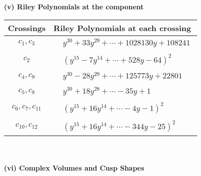 \documentclass[1p]{elsarticle_modified}
\theoremstyle{definition}
\begin{document}
\newpage\renewcommand{\arraystretch}{1}
\flushleft \textbf{(v) Riley Polynomials at the component}\newline \\
\begin{tabular}{m{50pt}|m{274pt}}
Crossings & \hspace{64pt}Riley Polynomials at each crossing \\
\hline $$\begin{aligned}c_{1},c_{3}\end{aligned}$$&$\begin{aligned}
&y^{30}+33 y^{29}+\cdots+1028130 y+108241
\end{aligned}$\\
\hline $$\begin{aligned}c_{2}\end{aligned}$$&$\begin{aligned}
&(y^{15}-7 y^{14}+\cdots+528 y-64)^{2}
\end{aligned}$\\
\hline $$\begin{aligned}c_{4},c_{9}\end{aligned}$$&$\begin{aligned}
&y^{30}-28 y^{29}+\cdots+125773 y+22801
\end{aligned}$\\
\hline $$\begin{aligned}c_{5},c_{8}\end{aligned}$$&$\begin{aligned}
&y^{30}+18 y^{28}+\cdots-35 y+1
\end{aligned}$\\
\hline $$\begin{aligned}c_{6},c_{7},c_{11}\end{aligned}$$&$\begin{aligned}
&(y^{15}+16 y^{14}+\cdots-4 y-1)^{2}
\end{aligned}$\\
\hline $$\begin{aligned}c_{10},c_{12}\end{aligned}$$&$\begin{aligned}
&(y^{15}+16 y^{14}+\cdots-344 y-25)^{2}
\end{aligned}$\\
\hline
\end{tabular}\\~\\
\newpage\flushleft \textbf{(vi) Complex Volumes and Cusp Shapes}
\end{document}

